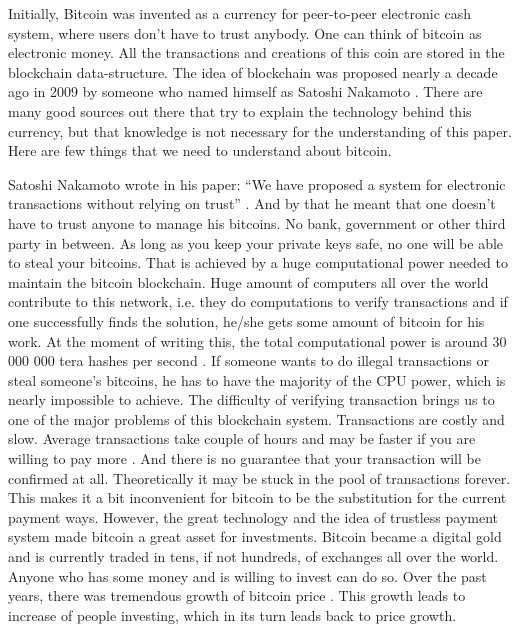 \documentclass[a4paper,11pt,oneside]{article}
\begin{document}
  Initially, Bitcoin was invented as a currency for peer-to-peer electronic cash system, where users don’t have to trust anybody. One can think of bitcoin as electronic money.  All the transactions and creations of this coin are stored in the blockchain data-structure. The idea of blockchain was proposed nearly a decade ago in 2009 by someone who named himself as Satoshi Nakamoto \cite{BTC}. There are many good sources out there that try to explain the technology behind this currency, but that knowledge is not necessary for the understanding of this paper. Here are few things that we need to understand about bitcoin. 
  
  Satoshi Nakamoto wrote in his paper: “We have proposed a system for electronic transactions without relying on trust” \cite{BTC}. And by that he meant that one doesn’t have to trust anyone to manage his bitcoins. No bank, government or other third party in between. As long as you keep your private keys safe, no one will be able to steal your bitcoins. That is achieved by a huge computational power needed to maintain the bitcoin blockchain. Huge amount of computers all over the world contribute to this network, i.e. they do computations to verify transactions and if one successfully finds the solution, he/she gets some amount of bitcoin for his work. At the moment of writing this, the total computational power is around 30 000 000 tera hashes per second \cite{hashrate}. If someone wants to do illegal transactions or steal someone’s bitcoins, he has to have the majority of the CPU power, which is nearly impossible to achieve. The difficulty of verifying transaction brings us to one of the major problems of this blockchain system. Transactions are costly and slow. Average transactions take couple of hours and may be faster if you are willing to pay more \cite{confirmationtime}. And there is no guarantee that your transaction will be confirmed at all. Theoretically it may be stuck in the pool of transactions forever. This makes it a bit inconvenient for bitcoin to be the substitution for the current payment ways. However, the great technology and the idea of trustless payment system made bitcoin a great asset for investments. Bitcoin became a digital gold and is currently traded in tens, if not hundreds, of exchanges all over the world. Anyone who has some money and is willing to invest can do so. Over the past years, there was tremendous growth of bitcoin price \cite{pricechart}. This growth leads to increase of people investing, which in its turn leads back to price growth. 
  
\end{document}
